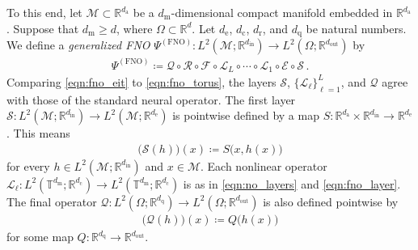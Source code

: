 \documentclass[pdflatex,sn-mathphys-num]{sn-jnl-preprint}
\newcommand{\R}{\mathbb{R}}
\newcommand{\T}{\mathbb{T}}
\newcommand{\cL}{\mathcal{L}}
\newcommand{\cF}{\mathcal{F}}
\newcommand{\cS}{\mathcal{S}}
\newcommand{\cR}{\mathcal{R}}
\newcommand{\cE}{\mathcal{E}}
\newcommand{\cQ}{\mathcal{Q}}
\newcommand{\cM}{\mathcal{M}}
\newcommand{\defeq}{\coloneqq} %
\theoremstyle{thmstyleone}%
\theoremstyle{thmstyletwo}%
\theoremstyle{thmstylethree}%
\numberwithin{equation}{section}
\numberwithin{theorem}{section}
\begin{document}
To this end, let $\cM\subset\R^{d_\mathrm{a}}$ be a $d_{\mathrm{m}}$-dimensional compact manifold embedded in $\R^{d_\mathrm{a}}$. Suppose that $d_\mathrm{m}\geq d$, where $\Omega\subset\R^d$. Let $d_\mathrm{e}$, $d_\mathrm{c}$, $d_\mathrm{r}$, and $d_\mathrm{q}$ be natural numbers. We define a \emph{generalized FNO} $\Psi^{(\mathrm{FNO})}\colon L^2(\cM;\R^{d_{\mathrm{in}}})\to L^2(\Omega;\R^{d_{\mathrm{out}}})$ by
\begin{align}\label{eqn:fno_eit}
    \Psi^{(\mathrm{FNO})}\defeq \cQ\circ\cR\circ \cF\circ\cL_L\circ\cdots\circ\cL_1\circ\cE\circ\cS\,.
\end{align}
Comparing \eqref{eqn:fno_eit} to \eqref{eqn:fno_torus}, the layers $\cS$, $\{\cL_\ell\}_{\ell=1}^L$, and $\cQ$ agree with those of the standard neural operator. The first layer $\cS\colon L^2(\cM;\R^{d_{\mathrm{in}}})\to L^2(\cM;\R^{d_{\mathrm{e}}})$ is pointwise defined by a map $S\colon \R^{d_\mathrm{a}}\times \R^{d_{\mathrm{in}}}\to \R^{d_{\mathrm{e}}}$. This means
\begin{align}\label{eqn:pw_lift}
    \bigl(\cS (h)\bigr)(x)\defeq S\bigl(x,h(x)\bigr)
\end{align}
for every $h\in L^2(\cM;\R^{d_{\mathrm{in}}})$ and $x\in\cM$. Each nonlinear operator $\cL_\ell\colon L^2(\T^{d_\mathrm{m}};\R^{d_{\mathrm{c}}})\to L^2(\T^{d_\mathrm{m}};\R^{d_{\mathrm{c}}})$ is as in \eqref{eqn:no_layers} and \eqref{eqn:fno_layer}.
The final operator $\cQ\colon L^2(\Omega;\R^{d_{\mathrm{q}}})\to L^2(\Omega;\R^{d_{\mathrm{out}}})$ is also defined pointwise by
\begin{align}\label{eqn:pw_proj}
    \bigl(\cQ (h)\bigr)(x)\defeq Q\bigl(h(x)\bigr)
\end{align}
for some map $Q\colon \R^{d_{\mathrm{q}}}\to \R^{d_{\mathrm{out}}}$.
\end{document}
